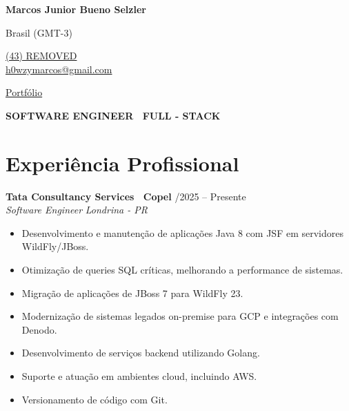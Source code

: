 \documentclass[a4paper,10pt]{article}
\newcommand{\entry}[4]{
  \noindent\textbf{#1} \hfill #2 \\
  \noindent\textit{#3} \hfill \textit{#4} \\
  \vspace{2pt}
}
\begin{document}
\small
\setlength{\parskip}{4pt}
\setlength{\parindent}{0pt}


\noindent
\begin{minipage}[t]{0.5\textwidth}
{\Large \textbf{Marcos Junior Bueno Selzler}}

\vspace{0.4em}

\end{minipage}%
\begin{minipage}[t]{0.5\textwidth}
\raggedleft

Brasil (GMT-3)

{\color{blue}} \href{tel:+5543REMOVED}{\faPhone \space (43) REMOVED} \\
{\color{blue}} \href{mailto:h0wzymarcos@gmail.com}{\faEnvelope \space h0wzymarcos@gmail.com} \\

\vspace{0.2em}

{\color{blue}} \href{https://linktr.ee/h0wzymarcos}{\faLink \space Portfólio}

\end{minipage}

\vspace{1em}

\begin{center}
    \textbf{SOFTWARE ENGINEER \textbar\ FULL - STACK}
\end{center}

\section*{Experiência Profissional}

\entry{Tata Consultancy Services \textbar\ Copel}{\faCalendar \space 05/2025 -- Presente}{Software Engineer}{Londrina - PR}
\vspace{-0.4em}
\begin{itemize}[leftmargin=*, itemsep=2pt]
\setlength\itemsep{0em}
\item Desenvolvimento e manutenção de aplicações Java 8 com JSF em servidores WildFly/JBoss.
\item Otimização de queries SQL críticas, melhorando a performance de sistemas.
\item Migração de aplicações de JBoss 7 para WildFly 23.
\item Modernização de sistemas legados on-premise para GCP e integrações com Denodo.
\item Desenvolvimento de serviços backend utilizando Golang.
\item Suporte e atuação em ambientes cloud, incluindo AWS.
\item Versionamento de código com Git.
\end{itemize}
\end{document}
